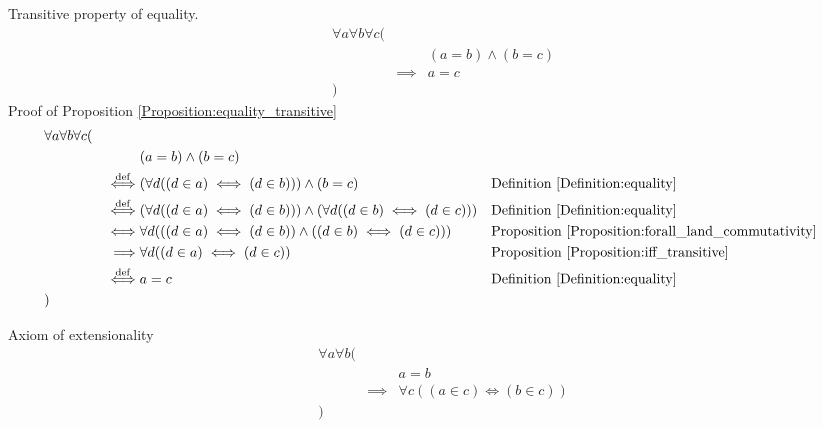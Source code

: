 \begin{prop}
\label{Proposition:equality_transitive}
Transitive property of equality.
\begin{align*}
& \forall a \forall b \forall c ( \\
& & & (a = b) \land (b = c) \\
& & \implies & a = c \\
& )
\end{align*}
Proof of Proposition \ref{Proposition:equality_transitive}
\begin{align*}
& \forall a \forall b \forall c ( \\
& & & (a = b) \land (b = c) \\
& & \overset{\operatorname{def}}{\iff} & (\forall d ((d \in a) \iff (d \in b))) \land (b = c)
& & \text{Definition \ref{Definition:equality}} \\
& & \overset{\operatorname{def}}{\iff} & (\forall d ((d \in a) \iff (d \in b))) \land (\forall d ((d \in b) \iff (d \in c)))
& & \text{Definition \ref{Definition:equality}} \\
& & \iff & \forall d (((d \in a) \iff (d \in b)) \land ((d \in b) \iff (d \in c)))
& & \text{Proposition \ref{Proposition:forall_land_commutativity}} \\
& & \implies & \forall d ((d \in a) \iff (d \in c))
& & \text{Proposition \ref{Proposition:iff_transitive}} \\
& & \overset{\operatorname{def}}{\iff} & a = c
& & \text{Definition \ref{Definition:equality}} \\
& )
\end{align*}
\end{prop}

\begin{axm}
\label{Axiom:extensionality}
Axiom of extensionality
\begin{align*}
& \forall a \forall b ( \\
& & & a = b \\
& & \implies & \forall c ((a \in c) \iff (b \in c)) \\
& )
\end{align*}
\end{axm}

